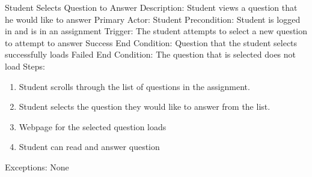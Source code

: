 	
	
    \begin{section}{Student Selects Question to Answer}
        Description: Student views a question that he would like to answer \newline
        Primary Actor: Student \newline
        Precondition: Student is logged in and is in an assignment         \newline
        Trigger: The student attempts to select a new question      to attempt to answer \newline
        Success End Condition: Question that the student selects     successfully loads \newline
        Failed End Condition: The question that is selected does     not load \newline
        \newline
        Steps:
        \begin{enumerate}
            \item{Student scrolls through the list of questions in the assignment.}
            \item{Student selects the question they would like to        answer from the list.}
            \item{Webpage for the selected question loads}
            \item{Student can read and answer question}
        \end{enumerate}
        Exceptions: None
    \end{section}
        
